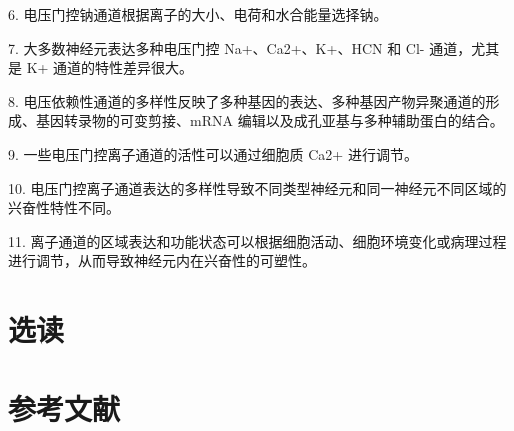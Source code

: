 6. 电压门控钠通道根据离子的大小、电荷和水合能量选择钠。 

7. 大多数神经元表达多种电压门控 Na+、Ca2+、K+、HCN 和 Cl- 通道，尤其是 K+ 通道的特性差异很大。 

8. 电压依赖性通道的多样性反映了多种基因的表达、多种基因产物异聚通道的形成、基因转录物的可变剪接、mRNA 编辑以及成孔亚基与多种辅助蛋白的结合。 

9. 一些电压门控离子通道的活性可以通过细胞质 Ca2+ 进行调节。 

10. 电压门控离子通道表达的多样性导致不同类型神经元和同一神经元不同区域的兴奋性特性不同。 

11. 离子通道的区域表达和功能状态可以根据细胞活动、细胞环境变化或病理过程进行调节，从而导致神经元内在兴奋性的可塑性。

\section{选读}

\section{参考文献}

